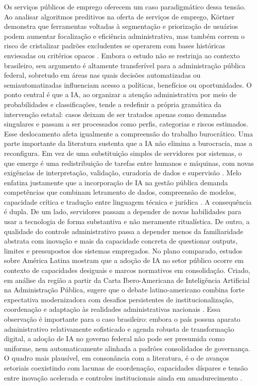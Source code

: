 \documentclass[12pt,a4paper]{article}
\begin{document}
Os serviços públicos de emprego oferecem um caso paradigmático dessa tensão. Ao analisar algoritmos preditivos na oferta de serviços de emprego, Körtner demonstra que ferramentas voltadas à segmentação e priorização de usuários podem aumentar focalização e eficiência administrativa, mas também correm o risco de cristalizar padrões excludentes se operarem com bases históricas enviesadas ou critérios opacos \autocite{krtner2021predictive}. Embora o estudo não se restrinja ao contexto brasileiro, seu argumento é altamente transferível para a administração pública federal, sobretudo em áreas nas quais decisões automatizadas ou semiautomatizadas influenciam acesso a políticas, benefícios ou oportunidades. O ponto central é que a IA, ao organizar a atenção administrativa por meio de probabilidades e classificações, tende a redefinir a própria gramática da intervenção estatal: casos deixam de ser tratados apenas como demandas singulares e passam a ser processados como perfis, categorias e riscos estimados.
Esse deslocamento afeta igualmente a compreensão do trabalho burocrático. Uma parte importante da literatura sustenta que a IA não elimina a burocracia, mas a reconfigura. Em vez de uma substituição simples de servidores por sistemas, o que emerge é uma redistribuição de tarefas entre humanos e máquinas, com novas exigências de interpretação, validação, curadoria de dados e supervisão \autocite{parycek2023artificial} \autocite{criado2024artificial}. Melo enfatiza justamente que a incorporação de IA na gestão pública demanda competências que combinam letramento de dados, compreensão de modelos, capacidade crítica e tradução entre linguagem técnica e jurídica \autocite{melo2026competencias}. A consequência é dupla. De um lado, servidores passam a depender de novas habilidades para usar a tecnologia de forma substantiva e não meramente ritualística. De outro, a qualidade do controle administrativo passa a depender menos da familiaridade abstrata com inovação e mais da capacidade concreta de questionar outputs, limites e pressupostos dos sistemas empregados.
No plano comparado, estudos sobre América Latina mostram que a adoção de IA no setor público ocorre em contexto de capacidades desiguais e marcos normativos em consolidação. Criado, em análise da região a partir da Carta Ibero-Americana de Inteligência Artificial na Administração Pública, sugere que o debate latino-americano combina forte expectativa modernizadora com desafios persistentes de institucionalização, coordenação e adaptação às realidades administrativas nacionais \autocite{criado2024inteligencia}. Essa observação é importante para o caso brasileiro: embora o país possua aparato administrativo relativamente sofisticado e agenda robusta de transformação digital, a adoção de IA no governo federal não pode ser presumida como uniforme, nem automaticamente alinhada a padrões consolidados de governança. O quadro mais plausível, em consonância com a literatura, é o de avanços setoriais coexistindo com lacunas de coordenação, capacidades díspares e tensão entre inovação acelerada e controles institucionais ainda em amadurecimento \autocite{goulart2025processos} \autocite{mariano2026inteligencia}.
\end{document}

